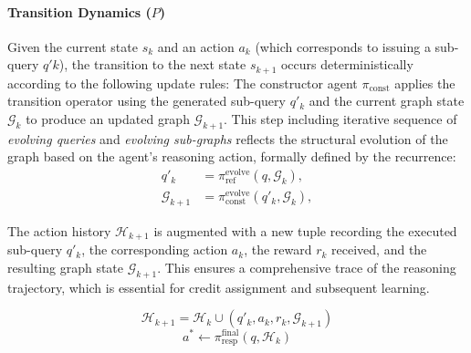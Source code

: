 \paragraph{Transition Dynamics ($P$)}
Given the current state $s_k$ and an action $a_k$ (which corresponds to issuing a sub-query $q'k$), the transition to the next state $s_{k+1}$ occurs deterministically according to the following update rules:
The constructor agent $\pi_{\text{const}}$ applies the transition operator using the generated sub-query $q'_k$ and the current graph state $\mathcal{G}_k$ to produce an updated graph $\mathcal{G}_{k+1}$. 
This step including iterative sequence of \emph{evolving queries} and \emph{evolving sub-graphs} reflects the structural evolution of the graph based on the agent's reasoning action, formally defined by the recurrence:
\begin{align}
    q'_{k} &= \pi_{\text{ref}}^{\text{evolve}}(q, \mathcal{G}_k), \\
    \mathcal{G}_{k+1} &= \pi_{\text{const}}^{\text{evolve}}(q'_k, \mathcal{G}_k),
\end{align}

The action history $\mathcal{H}_{k+1}$ is augmented with a new tuple recording the executed sub-query $q'_k$, the corresponding action $a_k$, the reward $r_k$ received, and the resulting graph state $\mathcal{G}_{k+1}$. This ensures a comprehensive trace of the reasoning trajectory, which is essential for credit assignment and subsequent learning.

\begin{equation}
\mathcal{H}_{k+1} = \mathcal{H}_k \cup { (q'_k, a_k, r_k, \mathcal{G}_{k+1}) }
\end{equation}
\begin{equation}
 a^* \gets \pi_{\text{resp}}^{\text{final}}(q, \mathcal{H}_k)
\end{equation}

